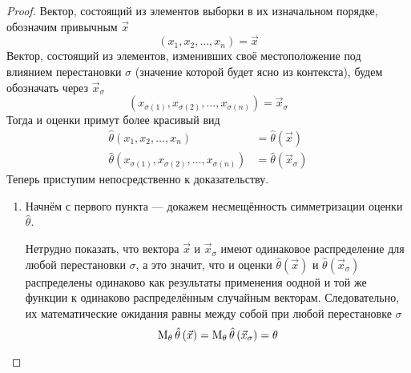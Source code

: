 \begin{proof}
  Вектор, состоящий из элементов выборки в их изначальном порядке,
  обозначим привычным $\vec{x}$
  \begin{equation*}
    \left(x_1, x_2, \dots, x_n\right) = \vec{x}
  \end{equation*}
  Вектор, состоящий из элементов, изменивших своё местоположение под влиянием
  перестановки $\sigma$ (значение которой будет ясно из контекста),
  будем обозначать через $\vec{x}_\sigma$
  \begin{equation*}
    \left(x_{\sigma\left(1\right)}, x_{\sigma\left(2\right)},
      \dots, x_{\sigma\left(n\right)}\right)= \vec{x}_\sigma
  \end{equation*}
  Тогда и оценки примут более красивый вид
  \begin{align*}
      \hat{\theta}\left(x_1, x_2, \dots, x_n\right)
      &= \hat{\theta}\left(\vec{x}\right)\\
      \hat{\theta}\left(x_{\sigma\left(1\right)},
          x_{\sigma\left(2\right)},
          \dots, x_{\sigma\left(n\right)}\right)
      &= \hat{\theta}\left(\vec{x}_\sigma\right)
  \end{align*}
  Теперь приступим непосредственно к доказательству.

  \begin{enumerate}%
    \item
      Начнём с первого пункта --- докажем несмещённость
      симметризации оценки $\hat{\theta}$.

      Нетрудно показать, что  вектора $\vec{x}$ и $\vec{x}_\sigma$
      имеют одинаковое распределение для любой перестановки $\sigma$,
      а это значит, что и оценки $\hat{\theta}\left(\vec{x}\right)$
      и $\hat{\theta}\left(\vec{x}_\sigma\right)$
      распределены одинаково как результаты применения оодной и той же
      функции к одинаково распределённым случайным векторам.
      Следовательно, их математические ожидания равны между собой
      при любой перестановке $\sigma$
      \begin{equation*}
        \operatorname{M}_{\theta} \hat{\theta}\left(\vec{x}\right)
        = \operatorname{M}_{\theta} \hat{\theta}\left(\vec{x}_\sigma\right)
        = \theta
      \end{equation*}


\end{enumerate}
\end{proof}
